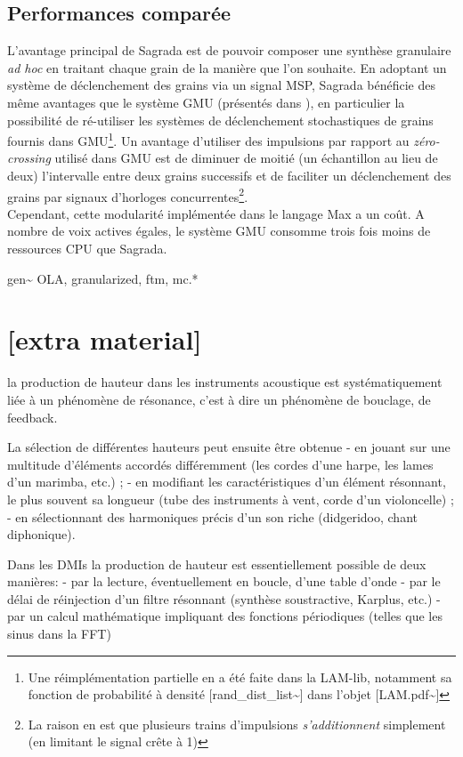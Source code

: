 \subsection{Performances comparée}

\noindent L'avantage principal de Sagrada est de pouvoir composer une synthèse granulaire \textit{ad hoc} en traitant chaque grain de la manière que l'on souhaite. En adoptant un système de déclenchement des grains via un signal \gls{MSP}, Sagrada bénéficie des même avantages que le système \gls{GMU} (présentés dans \cite{bascou_gmu_2005}), en particulier la possibilité de ré-utiliser les systèmes de déclenchement stochastiques de grains fournis dans \gls{GMU}\footnote{Une réimplémentation partielle en a été faite dans la LAM-lib, notamment sa fonction de probabilité à densité [rand\_dist\_list\textasciitilde{}] dans l'objet [LAM.pdf\textasciitilde{}]}. Un avantage d'utiliser des impulsions par rapport au \textit{zéro-crossing} utilisé dans GMU est de diminuer de moitié (un échantillon au lieu de deux) l'intervalle entre deux grains successifs et de faciliter un déclenchement des grains par signaux d'horloges concurrentes\footnote{La raison en est que plusieurs trains d'impulsions \textit{s'additionnent} simplement (en limitant le signal crête à 1)}.\\
\indent Cependant, cette modularité implémentée dans le langage Max a un coût. A nombre de voix actives égales, le système \gls{GMU} consomme trois fois moins de ressources \gls{CPU} que Sagrada.


gen\textasciitilde{ } OLA, granularized, ftm, mc.*


\section*{[extra material]}

la production de hauteur dans les instruments acoustique est systématiquement liée à un phénomène de résonance, c'est à dire un phénomène de bouclage, de feedback. 

La sélection de différentes hauteurs peut ensuite être obtenue 
- en jouant sur une multitude d'éléments accordés différemment (les cordes d'une harpe, les lames
d'un marimba, etc.) ;
- en modifiant les caractéristiques d'un élément résonnant, le plus souvent sa longueur (tube des
instruments à vent, corde d'un violoncelle) ;
- en sélectionnant des harmoniques précis d'un son riche (didgeridoo, chant diphonique).


Dans les DMIs la production de hauteur est essentiellement possible de deux manières: 
- par la lecture, éventuellement en boucle, d'une table d'onde
- par le délai de réinjection d'un filtre résonnant (synthèse soustractive, Karplus, etc.)
- par un calcul mathématique impliquant des fonctions périodiques (telles que les sinus dans la FFT)

